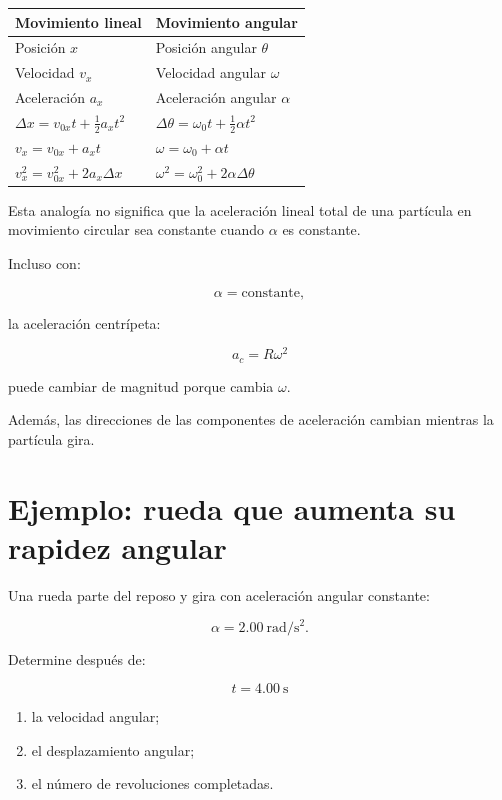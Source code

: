 \begin{center}
\begin{tabularx}{\textwidth}{>{\raggedright\arraybackslash}X
                            >{\raggedright\arraybackslash}X}
\toprule
Movimiento lineal & Movimiento angular \\
\midrule
Posición \(x\) & Posición angular \(\theta\) \\

Velocidad \(v_x\) & Velocidad angular \(\omega\) \\

Aceleración \(a_x\) & Aceleración angular \(\alpha\) \\

\(\Delta x=v_{0x}t+\frac12a_xt^2\)
&
\(\Delta\theta=\omega_0t+\frac12\alpha t^2\)
\\

\(v_x=v_{0x}+a_xt\)
&
\(\omega=\omega_0+\alpha t\)
\\

\(v_x^2=v_{0x}^2+2a_x\Delta x\)
&
\(\omega^2=\omega_0^2+2\alpha\Delta\theta\)
\\
\bottomrule
\end{tabularx}
\end{center}

\begin{advertencia}

Esta analogía no significa que la aceleración lineal total de una partícula en
movimiento circular sea constante cuando \(\alpha\) es constante.

Incluso con:

\[
\alpha=\text{constante},
\]

la aceleración centrípeta:

\[
a_c=R\omega^2
\]

puede cambiar de magnitud porque cambia \(\omega\).

Además, las direcciones de las componentes de aceleración cambian mientras
la partícula gira.

\end{advertencia}


\section{Ejemplo: rueda que aumenta su rapidez angular}

\begin{ejemplo}

Una rueda parte del reposo y gira con aceleración angular constante:

\[
\alpha=\SI{2.00}{\radian\per\second\squared}.
\]

Determine después de:

\[
t=\SI{4.00}{\second}
\]

\begin{enumerate}[label=\alph*)]
    \item la velocidad angular;
    \item el desplazamiento angular;
    \item el número de revoluciones completadas.
\end{enumerate}

\end{ejemplo}

